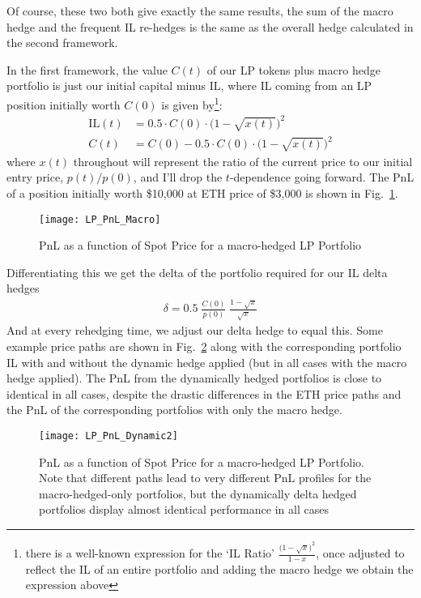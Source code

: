 \documentclass{article}
\begin{document}
Of course, these two both give exactly the same results, the sum of the macro hedge and the frequent IL re-hedges is the same as the overall hedge calculated in the second framework.

In the first framework, the value $C(t)$ of our LP tokens plus macro hedge portfolio is just our initial capital minus IL, where IL coming from an LP position initially worth $C(0)$ is given by\footnote{there is a well-known expression for the `IL Ratio' ${\frac {\bigl( 1 - \sqrt{x} \bigr)^2} {1 - x}}$, once adjusted to reflect the IL of an entire portfolio and adding the macro hedge we obtain the expression above}:
\begin{align}
\mathrm{IL}(t) &= 0.5 \cdot C(0) \cdot \bigl( 1 - \sqrt{x(t)} \bigr)^2 \\
C(t) &= C(0) - 0.5 \cdot C(0) \cdot \bigl( 1 - \sqrt{x(t)} \bigr)^2
\label{eqn:il_portfolio}
\end{align}
where $x(t)$ throughout will represent the ratio of the current price to our initial entry price, $p(t) / p(0)$, and I'll drop the $t$-dependence going forward. The PnL of a position initially worth \$10,000 at ETH price of \$3,000 is shown in Fig.~\ref{fig:lp_pnl_macro}.

\begin{figure}
\centering
\texttt{[image: LP\_PnL\_Macro]}
\caption{PnL as a function of Spot Price for a macro-hedged LP Portfolio}
\label{fig:lp_pnl_macro}
\end{figure}

Differentiating this we get the delta of the portfolio required for our IL delta hedges
\begin{align}
\delta = 0.5 \; {\frac {C(0)} {p(0)}} \; {\frac {1 - \sqrt{x}}{\sqrt{x}}}
\label{eqn:delta_portfolio}
\end{align}
And at every rehedging time, we adjust our delta hedge to equal this. Some example price paths are shown in Fig.~\ref{fig:lp_pnl_dynamic} along with the corresponding portfolio IL with and without the dynamic hedge applied (but in all cases with the macro hedge applied). The PnL from the dynamically hedged portfolios is close to identical in all cases, despite the drastic differences in the ETH price paths and the PnL of the corresponding portfolios with only the macro hedge.

\begin{figure}
\centering
\texttt{[image: LP\_PnL\_Dynamic2]}
\caption{PnL as a function of Spot Price for a macro-hedged LP Portfolio. Note that different paths lead to very different PnL profiles for the macro-hedged-only portfolios, but the dynamically delta hedged portfolios display almost identical performance in all cases}
\label{fig:lp_pnl_dynamic}
\end{figure}
\end{document}
